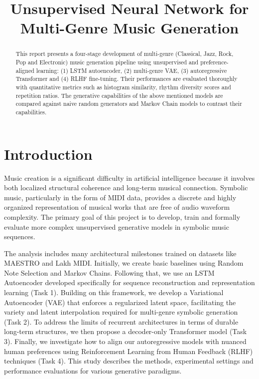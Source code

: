 \documentclass[conference]{IEEEtran}
\title{Unsupervised Neural Network for Multi-Genre Music Generation}
\author{\IEEEauthorblockN{Abrar Fahim}
\IEEEauthorblockA{\textit{Department of Computer Science} \\
\textit{BRAC University}\\
Student ID: 22201689}}
\begin{document}
\maketitle

\begin{abstract}
This report presents a four-stage development of multi-genre (Classical, Jazz, Rock, Pop and Electronic) music generation pipeline using unsupervised and preference-aligned learning: (1) LSTM autoencoder, (2) multi-genre VAE, (3) autoregressive Transformer and (4) RLHF fine-tuning. Their performances are evaluated thoroughly with quantitative metrics such as histogram similarity, rhythm diversity scores and repetition ratios. The generative capabilities of the above mentioned models are compared against naive random generators and Markov Chain models to contrast their capabilities.
\end{abstract}

\section{Introduction}
Music creation is a significant difficulty in artificial intelligence because it involves both localized structural coherence and long-term musical connection. Symbolic music, particularly in the form of MIDI data, provides a discrete and highly organized representation of musical works that are free of audio waveform complexity. The primary goal of this project is to develop, train and formally evaluate more complex unsupervised generative models in symbolic music sequences. 

The analysis includes many architectural milestones trained on datasets like MAESTRO and Lakh MIDI. Initially, we create basic baselines using Random Note Selection and Markov Chains. Following that, we use an LSTM Autoencoder developed specifically for sequence reconstruction and representation learning (Task 1). Building on this framework, we develop a Variational Autoencoder (VAE) that enforces a regularized latent space, facilitating the variety and latent interpolation required for multi-genre symbolic generation (Task 2). To address the limits of recurrent architectures in terms of durable long-term structures, we then propose a decoder-only Transformer model (Task 3). Finally, we investigate how to align our autoregressive models with nuanced human preferences using Reinforcement Learning from Human Feedback (RLHF) techniques (Task 4). This study describes the methods, experimental settings and performance evaluations for various generative paradigms.
\end{document}
